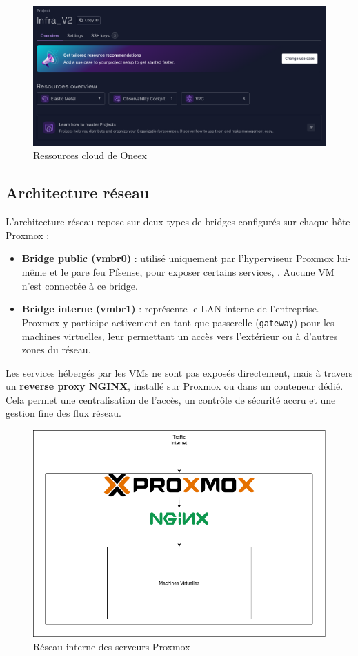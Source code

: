 \begin{figure} [H]
	\centering
	\includegraphics[width=.5\textwidth]{figures/Ressources cloud.png}
	\caption{Ressources cloud de Oneex}
\end{figure}

\subsection{Architecture réseau}

L’architecture réseau repose sur deux types de bridges configurés sur chaque hôte Proxmox :

\begin{itemize}
	\item \textbf{Bridge public (vmbr0)} : utilisé uniquement par l’hyperviseur Proxmox lui-même et le pare feu Pfsense, pour exposer certains services, . Aucune VM n’est connectée à ce bridge.
	\item \textbf{Bridge interne (vmbr1)} : représente le LAN interne de l’entreprise. Proxmox y participe activement en tant que passerelle (\texttt{gateway}) pour les machines virtuelles, leur permettant un accès vers l’extérieur ou à d’autres zones du réseau.
\end{itemize}

Les services hébergés par les VMs ne sont pas exposés directement, mais à travers un \textbf{reverse proxy NGINX}, installé sur Proxmox ou dans un conteneur dédié. Cela permet une centralisation de l’accès, un contrôle de sécurité accru et une gestion fine des flux réseau.

\begin{figure} [H]
	\centering
	\includegraphics[width=.5\textwidth]{figures/Reseau inter proxmox.png}
	\caption{Réseau interne des serveurs Proxmox}
\end{figure}

